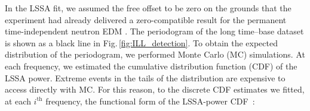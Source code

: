 In the LSSA fit, we assumed the free offset to be zero on the grounds that the experiment had already delivered a zero-compatible result for the permanent time-independent neutron EDM \cite{Baker2006, Baker2006B,Pendlebury2015}. The periodogram of the long time--base dataset is shown as a black line in Fig.\,\ref{fig:ILL_detection}.
To obtain the expected distribution of the periodogram, we performed Monte Carlo (MC) simulations. At each frequency, we estimated the cumulative distribution function (CDF) of the LSSA power. Extreme events in the tails of the distribution are expensive to access directly with MC. For this reason, to the discrete CDF estimates we fitted, at each $i^\textrm{th}$ frequency, the functional form of the LSSA-power CDF~\cite{Scargle1982}:

